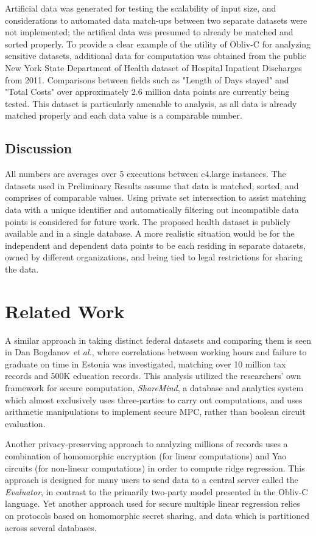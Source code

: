 \documentclass[conference]{IEEEtran}
\begin{document}
Artificial data was generated for testing the scalability of input size, and
considerations to automated data match-ups between two separate datasets were not
implemented; the artifical data was presumed to already be matched and sorted properly.
To provide a clear example of the utility of Obliv-C for analyzing sensitive datasets, 
additional data for computation was obtained from the public New York State Department 
of Health dataset of Hospital Inpatient Discharges from 2011\cite{healthdata:ny}. 
Comparisons between fields such as "Length of Days stayed" and "Total Costs" 
over approximately 2.6 million data points are currently being tested.
This dataset is particularly amenable to analysis, as all data is already 
matched properly and each data value is a comparable number.

\subsection{Discussion}
All numbers are averages over 5 executions between c4.large instances. The datasets used in Preliminary Results assume that data is matched, sorted, and 
comprises of comparable values. Using private set intersection to assist matching 
data with a unique identifier and automatically filtering out incompatible 
data points is considered for future work. The proposed health dataset is
publicly available and in a single database. A more realistic situation would be 
for the independent and dependent data points to be each residing in separate 
datasets, owned by different organizations, and being tied to legal restrictions 
for sharing the data.


\section{Related Work}
A similar approach in taking distinct federal datasets and comparing them is seen in
Dan Bogdanov \emph{et al.}, where correlations between working hours and failure to
graduate on time in Estonia was investigated, matching over 10 million 
tax records and 500K education records\cite{cryptoeprint:2015:1159}.
This analysis utilized the researchers' own framework for secure
computation, \emph{ShareMind}, a database and analytics system which 
almost exclusively uses three-parties to carry out computations, and uses arithmetic
manipulations to implement secure MPC, rather than boolean circuit evaluation\cite{sharemind}.

Another privacy-preserving approach to analyzing millions of records uses a
combination of homomorphic encryption (for linear computations) and Yao circuits 
(for non-linear computations) in order to compute ridge regression\cite{ridgeregression}.
This approach is designed for many users to send data to a central server called the 
\emph{Evaluator}, in contrast to the primarily two-party model presented in the Obliv-C
language. Yet another approach used for secure multiple linear regression 
relies on protocols based on homomorphic secret sharing, and data which is partitioned 
across several databases\cite{secretsharing}.
 
\end{document}
